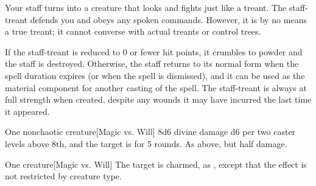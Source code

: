 \spelldur{\durmed \dismissable}
\spellline
\spelleffect Your staff turns into a creature that looks and fights just like a treant. The staff-treant defends you and obeys any spoken commands. However, it is by no means a true treant; it cannot converse with actual treants or control trees.

If the staff-treant is reduced to 0 or fewer hit points, it crumbles to powder and the staff is destroyed. Otherwise, the staff returns to its normal form when the spell duration expires (or when the spell is dismissed), and it can be used as the material component for another casting of the spell. The staff-treant is always at full strength when created, despite any wounds it may have incurred the last time it appeared.
\spellline
{}

\spellrng{\rngmed}
\begin{spelltarget}{One nonchaotic creature}[Magic vs. Will]
    \spellsuccess 8d6 divine damage \add d6 per two caster levels above 8th, and the target is \bewildered for 5 rounds.
    \spellfailure As above, but half damage.
\end{spelltarget}

\spellrng{\rngmed}
\spelldur{\durlong}
\begin{spelltarget}{One creature}[Magic vs. Will]
    \spellsuccess The target is charmed, as , except that the effect is not restricted by creature type.
\end{spelltarget}

